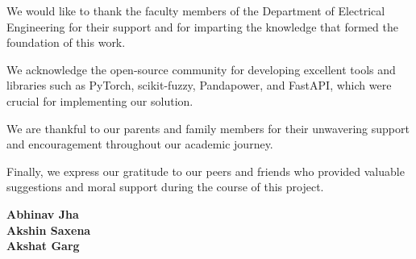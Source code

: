 \documentclass[12pt,a4paper]{report}
\newcommand{\authorone}{Abhinav Jha}
\newcommand{\authortwo}{Akshin Saxena}
\newcommand{\authorthree}{Akshat Garg}
\begin{document}
We would like to thank the faculty members of the Department of Electrical Engineering for their support and for imparting the knowledge that formed the foundation of this work.

We acknowledge the open-source community for developing excellent tools and libraries such as PyTorch, scikit-fuzzy, Pandapower, and FastAPI, which were crucial for implementing our solution.

We are thankful to our parents and family members for their unwavering support and encouragement throughout our academic journey.

Finally, we express our gratitude to our peers and friends who provided valuable suggestions and moral support during the course of this project.

\vspace{20mm}

\begin{flushright}
\textbf{\authorone}\\
\textbf{\authortwo}\\
\textbf{\authorthree}
\end{flushright}

\newpage

\end{document}
